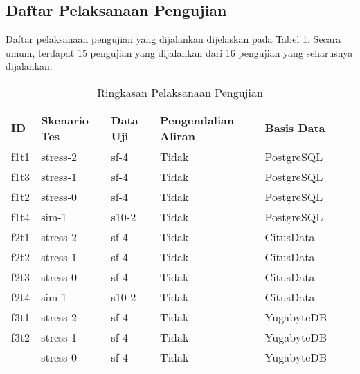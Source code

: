 \subsection{Daftar Pelaksanaan Pengujian}

Daftar pelaksanaan pengujian yang dijalankan dijelaskan pada Tabel \ref{tab:execution-summary}. Secara umum, terdapat 15 pengujian yang dijalankan dari 16 pengujian yang seharusnya dijalankan.

\begin{table}[H]
    \centering
    \caption{Ringkasan Pelaksanaan Pengujian}
    \label{tab:execution-summary}
    \begin{tabular}{|l|l|l|l|l|l|l|}
        \hline
        \textbf{ID} & \textbf{Skenario Tes} & \textbf{Data Uji} & \textbf{Pengendalian Aliran} & \textbf{Basis Data} \\ \hline
        f1t1        & stress-2              & sf-4              & Tidak                        & PostgreSQL          \\ \hline
        f1t3        & stress-1              & sf-4              & Tidak                        & PostgreSQL          \\ \hline
        f1t2        & stress-0              & sf-4              & Tidak                        & PostgreSQL          \\ \hline
        f1t4        & sim-1                 & s10-2             & Tidak                        & PostgreSQL          \\ \hline
        f2t1        & stress-2              & sf-4              & Tidak                        & CitusData           \\ \hline
        f2t2        & stress-1              & sf-4              & Tidak                        & CitusData           \\ \hline
        f2t3        & stress-0              & sf-4              & Tidak                        & CitusData           \\ \hline
        f2t4        & sim-1                 & s10-2             & Tidak                        & CitusData           \\ \hline
        f3t1        & stress-2              & sf-4              & Tidak                        & YugabyteDB          \\ \hline
        f3t2        & stress-1              & sf-4              & Tidak                        & YugabyteDB          \\ \hline
        -           & stress-0              & sf-4              & Tidak                        & YugabyteDB          \\ \hline

\end{tabular}
\end{table}

